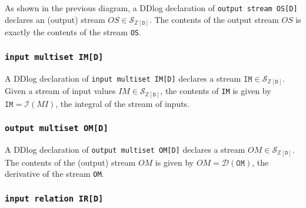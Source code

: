 \documentclass[10pt]{article}
\newcommand{\code}[1]{\texttt{#1}}
\newcommand{\Z}{\mathbb{Z}}  %
\newcommand{\stream}[1]{\ensuremath{\mathcal{S}_{#1}}}
\newcommand{\I}{\mathcal{I}}  %
\newcommand{\D}{\mathcal{D}}  %
\begin{document}
As shown in the previous diagram, a DDlog declaration of \code{output
  stream OS[D]} declares an (output) stream $OS \in
\stream{\Z[\code{D}]}$.  The contents of the output stream $OS$ is
exactly the contents of the stream \code{OS}.

\subsubsection{\code{input multiset IM[D]}}


A DDlog declaration of \code{input multiset IM[D]} declares a stream
$\code{IM} \in \stream{\Z[\code{D}]}$.  Given a stream of input values
$IM \in \stream{\Z[\code{D}]}$, the contents of \code{IM} is given by
$\code{IM} = \I(MI)$, the integral of the stream of inputs.

\subsubsection{\code{output multiset OM[D]}}


A DDlog declaration of \code{output multiset OM[D]} declares a stream
$OM \in \stream{\Z[\code{D}]}$.  The contents of the (output) stream
$OM$ is given by $OM = \D(\code{OM})$, the derivative of the stream
\code{OM}.

\subsubsection{\code{input relation IR[D]}}
\end{document}
